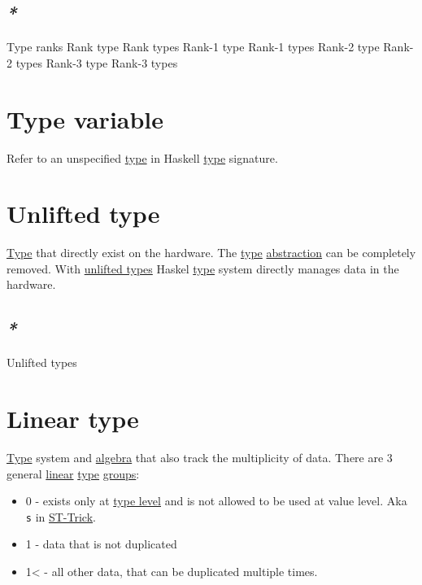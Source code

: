 \documentclass[a4paper,14pt,oneside]{book}
\begin{document}
\subsection{\emph{*}}
\label{sec:orgd28f396}

\label{orgb008230}Type ranks
\label{orgaf528d8}Rank type
\label{org9c5e46c}Rank types
\label{org428a36d}Rank-1 type
\label{orgcd68993}Rank-1 types
\label{orgca221de}Rank-2 type
\label{org5522bef}Rank-2 types
\label{org8497e00}Rank-3 type
\label{orgf188bde}Rank-3 types

\section{\label{org2c31999}Type variable}
\label{sec:org22268ae}
Refer to an unspecified \hyperref[org1eff537]{type} in Haskell \hyperref[org1eff537]{type} signature.

\section{\label{org3f09180}Unlifted type}
\label{sec:org06db483}
\hyperref[org1eff537]{Type} that directly exist on the hardware. The \hyperref[org1eff537]{type} \hyperref[orgfa1b674]{abstraction} can be completely removed.
With \hyperref[orge2fdf7f]{unlifted types} Haskel \hyperref[org1eff537]{type} system directly manages data in the hardware.

\subsection{\emph{*}}
\label{sec:orgbf78cd0}

\label{orge2fdf7f}Unlifted types

\section{\label{org9342a65}Linear type}
\label{sec:org988d6ea}
\hyperref[org1eff537]{Type} system and \hyperref[org19e2593]{algebra} that also track the multiplicity of data.
There are 3 general \hyperref[orgb94efad]{linear} \hyperref[org1eff537]{type} \hyperref[org4450235]{groups}:
\begin{itemize}
\item 0 - exists only at \hyperref[orgaf88cda]{type level} and is not allowed to be used at value level. Aka \texttt{s} in \hyperref[org1cd47b3]{ST-Trick}.
\item 1 - data that is not duplicated
\item 1< - all other data, that can be duplicated multiple times.
\end{itemize}
\end{document}
